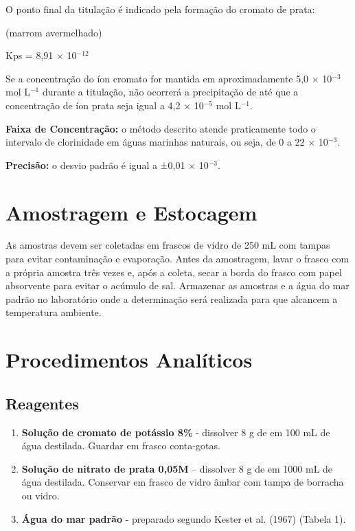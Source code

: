 \documentclass[a4paper,10pt]{SelfArx}
\begin{document}
O ponto final da titulação é indicado pela formação do cromato de prata:
\vspace{0.15cm}

 (marrom avermelhado) 

Kps = 8,91 $\times$ 10$^{-12}$
\vspace{0.15cm}

Se a concentração do íon cromato  for mantida em aproximadamente
5,0 $\times$ 10$^{-3}$ mol L$^{-1}$ durante a titulação, não ocorrerá a precipitação de  até que a concentração de íon prata  seja igual a 4,2 $\times$ 10$^{-5}$ mol L$^{-1}$.

\textbf{Faixa de Concentração:} o método descrito atende praticamente todo o intervalo de clorinidade em águas marinhas naturais, ou seja, de 0 a 22 $\times$ 10$^{-3}$.

\textbf{Precisão:} o desvio padrão é igual a ±0,01 $\times$ 10$^{-3}$.
\section{Amostragem e Estocagem}
As amostras devem ser coletadas em frascos de vidro de 250 mL com tampas para evitar contaminação e evaporação. Antes da amostragem, lavar o frasco com a própria amostra três vezes e, após a coleta, secar a borda do frasco com papel absorvente para evitar o acúmulo de sal. Armazenar as amostras e a água do mar padrão no laboratório onde a determinação será realizada para que alcancem a temperatura ambiente.

\section{Procedimentos Analíticos}

\subsection{Reagentes}

\begin{enumerate}[noitemsep]
\item \textbf{Solução de cromato de potássio  8\%} - dissolver 8 g de  em 100 mL de água destilada. Guardar em frasco conta-gotas.
\item \textbf{Solução de nitrato de prata  0,05M} – dissolver 8 g de  em 1000 mL de água destilada. Conservar em frasco de vidro âmbar com tampa de borracha ou vidro.
\item \textbf{Água do mar padrão} - preparado segundo Kester et al. (1967) (Tabela 1). 
\end{enumerate}
\end{document}
